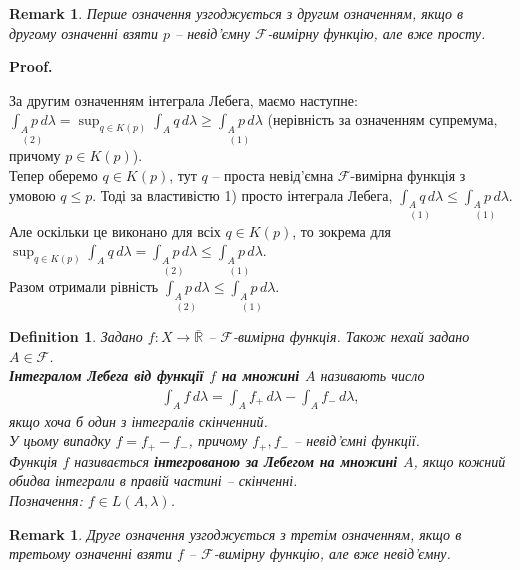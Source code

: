\documentclass[a4paper, 10pt]{article}
\makeatletter
\theoremstyle{theoremdd}
\newtheorem{definition}[theorem]{Definition}
\newtheorem{remark}[theorem]{Remark}
\renewenvironment{proof}[1][Proof.\\]{\par
\pushQED{\hfill \qed}%
\normalfont \topsep6\p@\@plus6\p@\relax
\trivlist
\item\relax
{\bfseries
#1\@addpunct{.}}\hspace\labelsep\ignorespaces
}{%
\popQED\endtrivlist\@endpefalse
}
\makeatother
\begin{document}
\begin{remark}
Перше означення узгоджується з другим означенням, якщо в другому означенні взяти $p$ -- невід'ємну $\mathcal{F}$-вимірну функцію, але вже просту.
\end{remark}

\begin{proof}
За другим означенням інтеграла Лебега, маємо наступне:\\
$\displaystyle\underset{(2)}{\int_A p\,d\lambda} = \sup_{q \in K(p)} \int_A q\,d\lambda \geq \underset{(1)}{\int_A p\,d\lambda}$ (нерівність за означенням супремума, причому $p \in K(p)$).\\
Тепер оберемо $q \in K(p)$, тут $q$ -- проста невід'ємна $\mathcal{F}$-вимірна функція з умовою $q \leq p$. Тоді за властивістю 1) просто інтеграла Лебега, $\displaystyle\underset{(1)}{\int_A q\,d\lambda} \leq \underset{(1)}{\int_A p\,d\lambda}$. Але оскільки це виконано для всіх $q \in K(p)$, то зокрема для $\displaystyle \sup_{q \in K(p)}\int_A q\,d\lambda = \underset{(2)}{\int_A p\,d\lambda} \leq \underset{(1)}{\int_A p\,d\lambda}$.\\
Разом отримали рівність $\displaystyle\underset{(2)}{\int_A p\,d\lambda} \leq \underset{(1)}{\int_A p\,d\lambda}$.
\end{proof}

\begin{definition}
Задано $f \colon X \to \bar{\mathbb{R}}$ -- $\mathcal{F}$-вимірна функція. Також нехай задано $A \in \mathcal{F}$.\\
\textbf{Інтегралом Лебега від функції $f$ на множині $A$} називають число
\begin{align*}
\int_A f\,d\lambda = \int_A f_+\,d\lambda - \int_A f_-\,d\lambda,
\end{align*}
якщо хоча б один з інтегралів скінченний.\\
У цьому випадку $f = f_+ - f_-$, причому $f_+,f_-$ -- невід'ємні функції.
\bigskip \\
Функція $f$ називається \textbf{інтегрованою за Лебегом на множині $A$}, якщо кожний обидва інтеграли в правій частині -- скінченні.\\
Позначення: $f \in L(A,\lambda)$.
\end{definition}

\begin{remark}
Друге означення узгоджується з третім означенням, якщо в третьому означенні взяти $f$ -- $\mathcal{F}$-вимірну функцію, але вже невід'ємну.
\end{remark}
\end{document}

